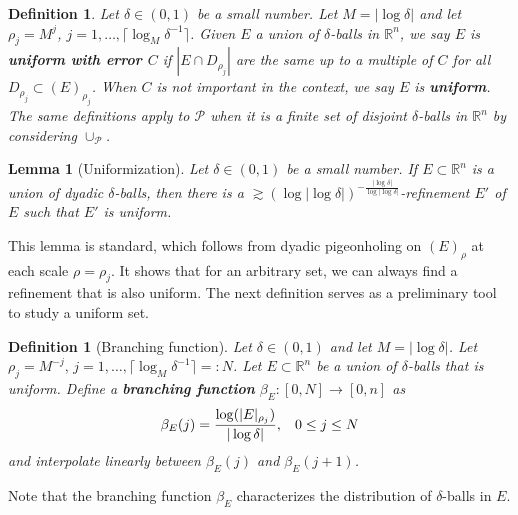 \documentclass{amsart}
\numberwithin{equation}{section}
\newtheorem{lemma}[theorem]{Lemma}
\newtheorem{definition}[theorem]{Definition}
\newcommand{\be}{\beta}
\newcommand{\de}{\delta}
\newcommand{\cp}{\mathcal P}
\newcommand{\ZR}{\mathbb{R}}
\begin{document}
\smallskip


\begin{definition}
\label{m-uniform}
Let $\delta\in(0,1)$ be a small number.
Let $M=|\log\de|$ and let $\rho_j = M^{j}$, $j=1,\dots, \lceil\log_M\de^{-1}\rceil$.
Given $E$ a union of $\de$-balls in $\ZR^n$, we say $E$ is {\bf uniform  with error $C$}  if $|E\cap D_{\rho_j}|$ are  the same up to a multiple of $C$ for all $D_{\rho_j}\subset(E)_{\rho_j}$. 
When $C$ is not important in the context, we say $E$ is {\bf uniform}. 
The same definitions apply to $\cp$ when it is a finite set of disjoint $\de$-balls in $\ZR^n$ by considering $\cup_{\cp}$.

\end{definition}




\begin{lemma}[Uniformization]
\label{uniformization}
Let $\delta\in(0,1)$ be a small number.
If $E\subset\ZR^n$ is a union of dyadic $\de$-balls, then there is a $\gtrsim (\log|\log\de|)^{-\frac{|\log\de|}{\log|\log\de|}}$-refinement $E'$ of $E$ such that $E'$ is uniform.
\end{lemma}


This lemma is standard, which follows from dyadic pigeonholing on $(E)_\rho$ at each scale $\rho=\rho_j$. 
It shows that for an arbitrary set, we can always find a refinement that is also uniform. 
The next definition serves as a preliminary tool to study a uniform set.

\begin{definition}[Branching function]
Let $\delta\in(0,1)$ and let $M=|\log\de|$.
Let $\rho_j =M^{-j},\, j=1, \dots,  \lceil \log_M\de^{-1}\rceil=: N $.
Let $E\subset\ZR^n$ be a union of $\de$-balls that is uniform.
Define a {\bf branching function} $\be_E:[0,N]\to[0,n]$ as
\begin{equation}
    \be_E(j)=\frac{\log(|E|_{\rho_j})}{ |\log \delta|}, \hspace{.3cm}0\leq j\leq N
\end{equation}
and interpolate linearly between $\beta_E( j)$ and $\beta_E(j+1)$. 
\end{definition}
\noindent Note that the branching function $\be_E$  characterizes the distribution of $\de$-balls in $E$.
\end{document}
